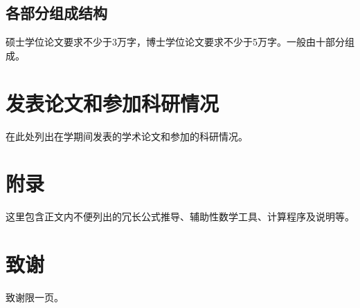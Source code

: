 \documentclass[a4paper, twoside, openright, 12pt]{ctexbook}
\begin{document}
\section{各部分组成结构}
硕士学位论文要求不少于3万字，博士学位论文要求不少于5万字。一般由十部分组成。

\backmatter

\cleardoublepage
{}
{} %

\renewcommand{\bibsection}{
    \par
    \vspace*{30pt}
    \centerline{\heiti\zihao{4} 参考文献}
    \vspace*{36pt}
    \par
    \markboth{参考文献}{} %
}



\chapter*{发表论文和参加科研情况} %
在此处列出在学期间发表的学术论文和参加的科研情况。

\chapter*{附录}
这里包含正文内不便列出的冗长公式推导、辅助性数学工具、计算程序及说明等。

\chapter*{致谢}
致谢限一页。
\end{document}
